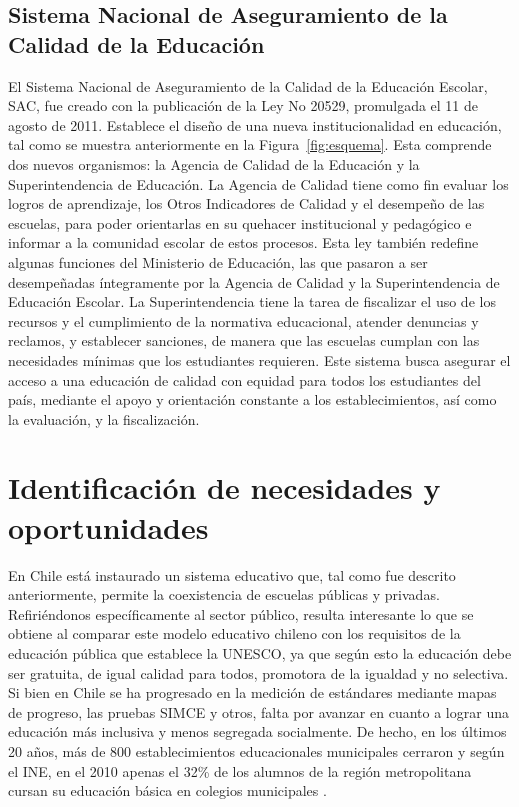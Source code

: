 \subsection{Sistema Nacional de Aseguramiento de la Calidad de la Educación}

El Sistema Nacional de Aseguramiento de la Calidad de la Educación Escolar, SAC, fue creado con la publicación de la Ley No 20529, promulgada el 11 de agosto de 2011. Establece el diseño de una nueva institucionalidad en educación, tal como se muestra anteriormente en la Figura~\ref{fig:esquema}. Esta comprende dos nuevos organismos: la Agencia de Calidad de la Educación y la Superintendencia de Educación.
La Agencia de Calidad tiene como fin evaluar los logros de aprendizaje, los Otros Indicadores de Calidad y el desempeño de las escuelas, para poder orientarlas en su quehacer institucional y pedagógico e informar a la comunidad escolar de estos procesos.
Esta ley también redefine algunas funciones del Ministerio de Educación, las que pasaron a ser desempeñadas íntegramente por la Agencia de Calidad y la Superintendencia de Educación Escolar.
La Superintendencia tiene la tarea de fiscalizar el uso de los recursos y el cumplimiento de la normativa educacional, atender denuncias y reclamos, y establecer sanciones, de manera que las escuelas cumplan con las necesidades mínimas que los estudiantes requieren.
Este sistema busca asegurar el acceso a una educación de calidad con equidad para todos los estudiantes del país, mediante el apoyo y orientación constante a los establecimientos, así como la evaluación, y la fiscalización. \cite{sac}

\section{Identificación de necesidades y oportunidades}
En Chile está instaurado un sistema educativo que, tal como fue descrito anteriormente, permite la coexistencia de escuelas públicas y privadas. Refiriéndonos específicamente al sector público, resulta interesante lo que se obtiene al comparar este modelo educativo chileno con los requisitos de la educación pública que establece la UNESCO, ya que según esto la educación debe ser gratuita, de igual calidad para todos, promotora de la igualdad y no selectiva. Si bien en Chile se ha progresado en la medición de estándares mediante mapas de progreso, las pruebas SIMCE y otros, falta por avanzar en cuanto a lograr una educación más inclusiva y menos segregada socialmente. De hecho, en los últimos 20 años, más de 800 establecimientos educacionales municipales cerraron \cite{biobio} y según el INE, en el 2010 apenas el 32\% de los alumnos de la región metropolitana cursan su educación básica en colegios municipales \cite{ine}. 


